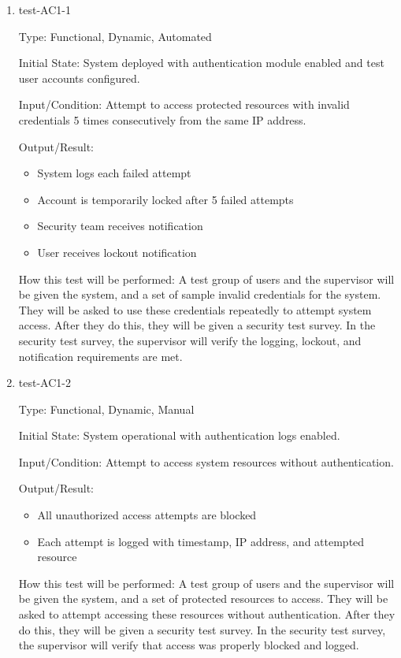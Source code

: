 \documentclass[12pt, titlepage]{article}
\begin{document}
\begin{enumerate}

    \item{test-AC1-1} \label{test-AC1-1}
    
    Type: Functional, Dynamic, Automated
    
    Initial State: System deployed with authentication module enabled and test user accounts configured.
    
    Input/Condition: Attempt to access protected resources with invalid credentials 5 times consecutively from the same IP address.
    
    Output/Result: 
    \begin{itemize}
        \item System logs each failed attempt
        \item Account is temporarily locked after 5 failed attempts
        \item Security team receives notification
        \item User receives lockout notification
    \end{itemize}
    
    How this test will be performed: A test group of users and the supervisor will be given the system, and a set of sample invalid credentials for the system. They will be asked to use these credentials repeatedly to attempt system access. After they do this, they will be given a security test survey. In the security test survey, the supervisor will verify the logging, lockout, and notification requirements are met.

    \item{test-AC1-2}  \label{test-AC1-2}
    
    Type: Functional, Dynamic, Manual
    
    Initial State: System operational with authentication logs enabled.
    
    Input/Condition: Attempt to access system resources without authentication.
    
    Output/Result: 
    \begin{itemize}
        \item All unauthorized access attempts are blocked
        \item Each attempt is logged with timestamp, IP address, and attempted resource
    \end{itemize}
    
    How this test will be performed: A test group of users and the supervisor will be given the system, and a set of protected resources to access. They will be asked to attempt accessing these resources without authentication. After they do this, they will be given a security test survey. In the security test survey, the supervisor will verify that access was properly blocked and logged.
\end{enumerate}
\end{document}
